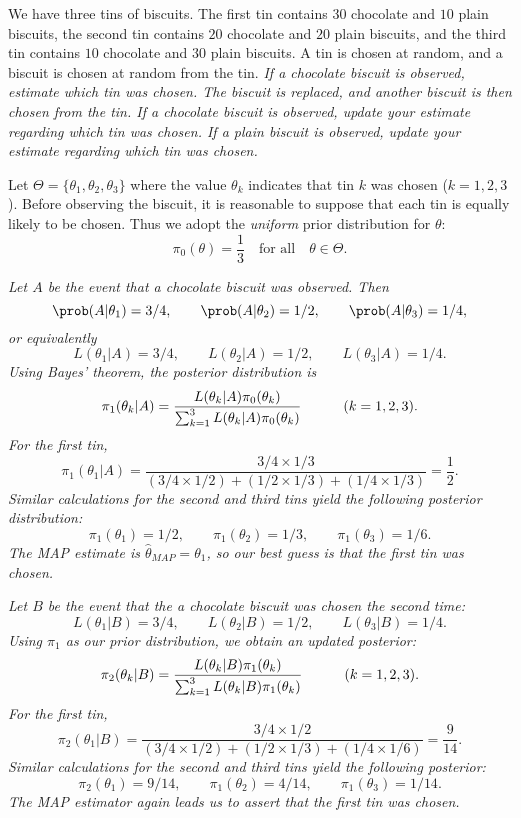 \begin{example}\label{ex:biscuits}
We have three tins of biscuits. The first tin contains $30$ chocolate and $10$ plain biscuits, the second tin contains $20$ chocolate and $20$ plain biscuits, and the third tin contains $10$ chocolate and $30$ plain biscuits. A tin is chosen at random, and a biscuit is chosen at random from the tin.
\ben
\it If a chocolate biscuit is observed, estimate which tin was chosen.
\een
The biscuit is replaced, and another biscuit is then chosen from the tin.
\ben{}
\it If a chocolate biscuit is observed, update your estimate regarding which tin was chosen.
\it If a plain biscuit is observed, update your estimate regarding which tin was chosen.
\een
\end{example}

\begin{solution}
Let $\Theta = \{\theta_1,\theta_2,\theta_3\}$ where the value $\theta_k$ indicates that tin $k$ was chosen ($k=1,2,3$). Before observing the biscuit, it is reasonable to suppose that each tin is equally likely to be chosen. Thus we adopt the \emph{uniform} prior distribution for $\theta$:
\[
\pi_0(\theta) = \frac{1}{3} \quad\text{for all}\quad \theta\in\Theta.
\]

\ben
\it %
Let $A$ be the event that a chocolate biscuit was observed. Then
\[
\prob(A|\theta_1)=3/4,\qquad \prob(A|\theta_2)=1/2,\qquad \prob(A|\theta_3)=1/4,
\]
or equivalently
\[
L(\theta_1| A)=3/4,\qquad L(\theta_2| A)=1/2,\qquad L(\theta_3| A)=1/4.
\]
Using Bayes' theorem, the posterior distribution is
\[
\pi_1(\theta_k|A) = \frac{L(\theta_k| A)\pi_0(\theta_k)}{\sum_{k=1}^3 L(\theta_k| A)\pi_0(\theta_k)}
\text{\quad\qquad ($k=1,2,3$).}
\]
For the first tin,
\[
\pi_1(\theta_1|A) = \frac{3/4\times 1/3}{(3/4\times 1/2) + (1/2\times 1/3) + (1/4\times 1/3)} = \frac{1}{2}.
\]
Similar calculations for the second and third tins yield the following posterior distribution:
\[
\pi_1(\theta_1) = 1/2,\qquad \pi_1(\theta_2) = 1/3, \qquad \pi_1(\theta_3) = 1/6.
\]
The MAP estimate is $\hat{\theta}_{MAP} = \theta_1$, so our best guess is that the first tin was chosen.


\it %
Let $B$ be the event that the a chocolate biscuit was chosen the second time:
\[
L(\theta_1|B)=3/4,\qquad L(\theta_2|B)=1/2,\qquad L(\theta_3|B)=1/4.
\]
Using $\pi_1$ as our prior distribution, we obtain an updated posterior:
\[
\pi_2(\theta_k|B) = \frac{L(\theta_k|B)\pi_1(\theta_k)}{\sum_{k=1}^3 L(\theta_k| B)\pi_1(\theta_k)}
\text{\quad\qquad ($k=1,2,3$).}
\]
For the first tin,
\[
\pi_2(\theta_1|B) = \frac{3/4\times 1/2}{(3/4\times 1/2) + (1/2\times 1/3) + (1/4\times 1/6)} = \frac{9}{14}.
\]
Similar calculations for the second and third tins yield the following posterior:
\[
\pi_2(\theta_1) = 9/14,\qquad \pi_1(\theta_2) = 4/14, \qquad \pi_1(\theta_3) = 1/14.
\]
The MAP estimator again leads us to assert that the first tin was chosen.


\end{solution}
